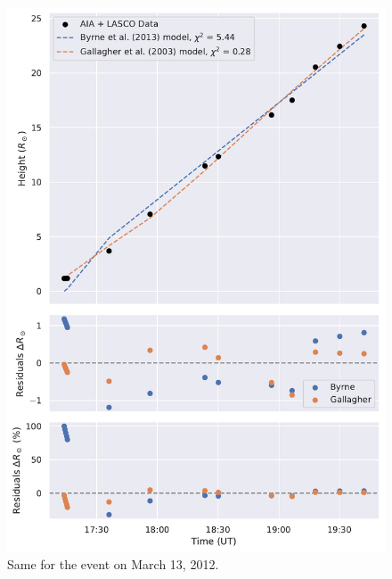 \begin{figure}[!htp]
	\centering
	\includegraphics[width=0.8\hsize]{chapter2/figs/appendix/height_profile_residuals_aia_lasco_120313_01.pdf}
	\caption{Same for the event on March 13, 2012.}
\end{figure}

